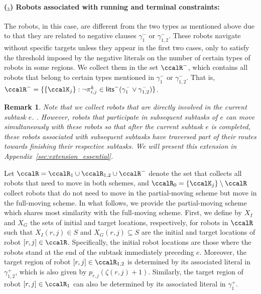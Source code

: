 \documentclass[Afour,sageh,times]{sagej}
\newtheorem{rem}[thm]{Remark}
\newcounter{mycounter}
\renewcommand{\ap}[3]{\mathcal{\pi}_{{#1},{#2}}^{#3}}
\begin{document}
{ \paragraph{($_3$) Robots associated with running and terminal constraints:}\label{sec:essential_c} The robots, in this case, are different from the two types as mentioned above due to that they are related to negative clauses $\gamma_1^-$ or $\gamma_{1,2}^-$. These robots navigate without specific targets unless they appear in the first two cases, only to satisfy the threshold imposed by the negative literals on the number of certain types of robots in some regions. We collect them in the set $\ccalR^-$, which contains all robots that belong to certain types mentioned in $\gamma_1^-$ or $\gamma_{1,2}^-$. That is, $\ccalR^- = \{\{\ccalK_j\}: \neg \ap{i}{j}{k} \in \mathsf{lits}^- (\gamma_1^-  \vee \gamma_{1,2}^-) \}$.


 \begin{rem}
  Note that we collect robots that are directly involved in the current subtask $e$. . However, robots that participate in subsequent subtasks of $e$ can move simultaneously with these robots so that after the current subtask $e$ is completed, these robots associated with subsequent subtasks have traversed part of their routes towards finishing their respective subtasks. We will present this extension in Appendix~\ref{sec:extension_essential}.
 \end{rem}

Let $\ccalR = \ccalR_1 \cup\ccalR_{1,2}  \cup \ccalR^-$ denote the set that collects all robots that need to move in both schemes, and $\ccalR_0 = \{\ccalK_j\}\setminus\ccalR$ collect robots that do not need to move in the partial-moving scheme but move in the full-moving scheme. In what follows, we provide the partial-moving scheme which shares most similarity with the full-moving scheme. First, we define by $X_I$ and $X_G$ the sets of initial and target locations, respectively, for robots in $\ccalR$  such that $X_I(r,j) \in S$ and $X_G(r,j)\subseteq S$ are the initial  and target locations of robot $[r,j] \in \ccalR$. Specifically, the initial robot locations are those where the robots stand at the end of the subtask immediately preceding $e$. Moreover, the target region of  robot $[r,j] \in \ccalR_{1,2}$ is determined  by its associated literal in $\gamma_{1,2}^+$, which is also given by  $p_{r,j}(\zeta(r,j)+1)$. Similarly, the target region of robot $[r,j] \in \ccalR_{1}$ can also be determined by its associated literal in $\gamma_1^+$. %

}
\end{document}
